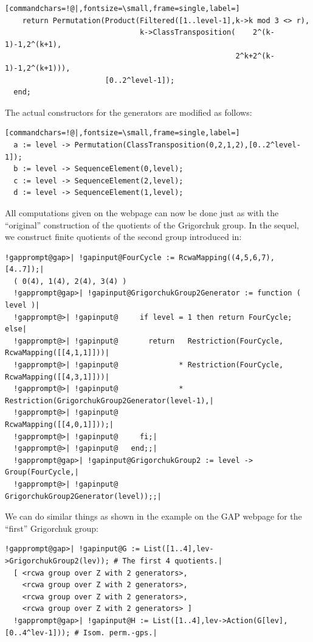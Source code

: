 \documentclass[a4paper,11pt]{report}
\begin{document}
{{\begin{Verbatim}[commandchars=!@|,fontsize=\small,frame=single,label=]
    return Permutation(Product(Filtered([1..level-1],k->k mod 3 <> r),
                               k->ClassTransposition(    2^(k-1)-1,2^(k+1),
                                                     2^k+2^(k-1)-1,2^(k+1))),
                       [0..2^level-1]);
  end;
\end{Verbatim}
 The actual constructors for the generators are modified as follows: 
\begin{Verbatim}[commandchars=!@|,fontsize=\small,frame=single,label=]
  a := level -> Permutation(ClassTransposition(0,2,1,2),[0..2^level-1]);
  b := level -> SequenceElement(0,level);
  c := level -> SequenceElement(2,level);
  d := level -> SequenceElement(1,level);
\end{Verbatim}
 All computations given on the webpage can now be done just as with the ``original'' construction of the quotients of the Grigorchuk group. In the sequel, we
construct finite quotients of the second group introduced in{\nobreakspace}\cite{Grigorchuk80}: 
\begin{Verbatim}[commandchars=!@|,fontsize=\small,frame=single,label=Example]
  !gapprompt@gap>| !gapinput@FourCycle := RcwaMapping((4,5,6,7),[4..7]);|
  ( 0(4), 1(4), 2(4), 3(4) )
  !gapprompt@gap>| !gapinput@GrigorchukGroup2Generator := function ( level )|
  !gapprompt@>| !gapinput@     if level = 1 then return FourCycle; else|
  !gapprompt@>| !gapinput@       return   Restriction(FourCycle, RcwaMapping([[4,1,1]]))|
  !gapprompt@>| !gapinput@              * Restriction(FourCycle, RcwaMapping([[4,3,1]]))|
  !gapprompt@>| !gapinput@              * Restriction(GrigorchukGroup2Generator(level-1),|
  !gapprompt@>| !gapinput@                            RcwaMapping([[4,0,1]]));|
  !gapprompt@>| !gapinput@     fi;|
  !gapprompt@>| !gapinput@   end;;|
  !gapprompt@gap>| !gapinput@GrigorchukGroup2 := level -> Group(FourCycle,|
  !gapprompt@>| !gapinput@                                      GrigorchukGroup2Generator(level));;|
\end{Verbatim}
 We can do similar things as shown in the example on the \textsf{GAP} webpage for the ``first'' Grigorchuk group: 
\begin{Verbatim}[commandchars=!@|,fontsize=\small,frame=single,label=Example]
  !gapprompt@gap>| !gapinput@G := List([1..4],lev->GrigorchukGroup2(lev)); # The first 4 quotients.|
  [ <rcwa group over Z with 2 generators>, 
    <rcwa group over Z with 2 generators>, 
    <rcwa group over Z with 2 generators>, 
    <rcwa group over Z with 2 generators> ]
  !gapprompt@gap>| !gapinput@H := List([1..4],lev->Action(G[lev],[0..4^lev-1])); # Isom. perm.-gps.|

\end{Verbatim}}}
\end{document}

